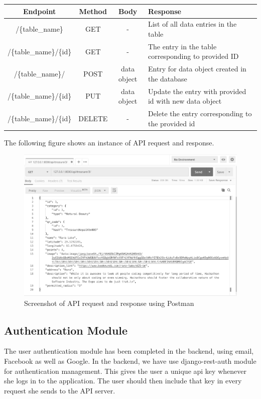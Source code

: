 \documentclass[12pt, a4paper, oneside]{article}
\begin{document}
\begin{table}[H]
\begin{tabularx}{\linewidth}{|c|c|c|X|}
\hline
\rowcolor[HTML]{C0C0C0} 
\textbf{Endpoint}                & \textbf{Method} & \textbf{Body}        & \textbf{Response}                                               \\ \hline
/\{table\_name\}        & GET    & -           & List of all data entries in the table                  \\ \hline
/\{table\_name\}/\{id\} & GET    & -           & The entry in the table corresponding to provided ID    \\ \hline
/\{table\_name\}/       & POST   & data object & Entry for data object created in the database          \\ \hline
/\{table\_name\}/\{id\} & PUT    & data object & Update the entry with provided id with new data object \\ \hline
/\{table\_name\}/\{id\} & DELETE & -           & Delete the entry corresponding to the provided id      \\ \hline
\end{tabularx}
\end{table}

The following figure shows an instance of API request and response.

\begin{figure}[H]
\includegraphics[width=\linewidth, keepaspectratio]{screenshots/api.png}
\centering
\caption{Screenshot of API request and response using Postman}
\label{fig:auth-sequence}
\end{figure}


\subsection{Authentication Module}
The user authentication module has been completed in the backend, using email, Facebook as well as Google. In the backend, we have use django-rest-auth module for authentication management. This gives the user a unique api key whenever she logs in to the application. The user should then include that key in every request she sends to the API server.
\end{document}
